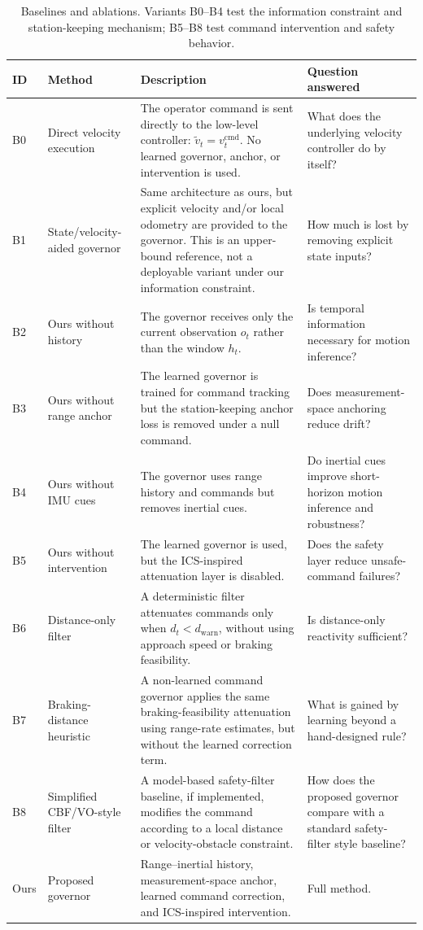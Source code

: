 \documentclass[11pt]{article}
\begin{document}
\begin{table}[t]
\centering
\caption{Baselines and ablations.  Variants B0--B4 test the information
constraint and station-keeping mechanism; B5--B8 test command intervention and
safety behavior.}
\label{tab:baseline_matrix}
\small
\setlength{\tabcolsep}{3pt}
\begin{tabular}{L{0.08\textwidth}L{0.22\textwidth}L{0.37\textwidth}L{0.22\textwidth}}
\toprule
\textbf{ID} & \textbf{Method} & \textbf{Description} & \textbf{Question answered} \\
\midrule
B0 & Direct velocity execution & The operator command is sent directly to the low-level controller: $\tilde v_t=v^{\mathrm{cmd}}_t$.  No learned governor, anchor, or intervention is used. & What does the underlying velocity controller do by itself? \\
B1 & State/velocity-aided governor & Same architecture as ours, but explicit velocity and/or local odometry are provided to the governor.  This is an upper-bound reference, not a deployable variant under our information constraint. & How much is lost by removing explicit state inputs? \\
B2 & Ours without history & The governor receives only the current observation $o_t$ rather than the window $h_t$. & Is temporal information necessary for motion inference? \\
B3 & Ours without range anchor & The learned governor is trained for command tracking but the station-keeping anchor loss is removed under a null command. & Does measurement-space anchoring reduce drift? \\
B4 & Ours without IMU cues & The governor uses range history and commands but removes inertial cues. & Do inertial cues improve short-horizon motion inference and robustness? \\
B5 & Ours without intervention & The learned governor is used, but the ICS-inspired attenuation layer is disabled. & Does the safety layer reduce unsafe-command failures? \\
B6 & Distance-only filter & A deterministic filter attenuates commands only when $d_t<d_{\mathrm{warn}}$, without using approach speed or braking feasibility. & Is distance-only reactivity sufficient? \\
B7 & Braking-distance heuristic & A non-learned command governor applies the same braking-feasibility attenuation using range-rate estimates, but without the learned correction term. & What is gained by learning beyond a hand-designed rule? \\
B8 & Simplified CBF/VO-style filter & A model-based safety-filter baseline, if implemented, modifies the command according to a local distance or velocity-obstacle constraint. & How does the proposed governor compare with a standard safety-filter style baseline? \\
Ours & Proposed governor & Range--inertial history, measurement-space anchor, learned command correction, and ICS-inspired intervention. & Full method. \\
\bottomrule
\end{tabular}
\end{table}
\end{document}
